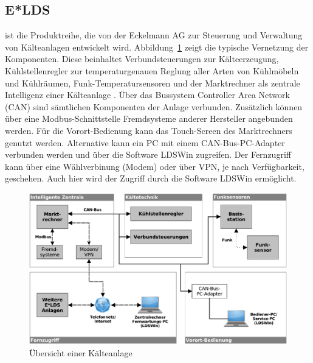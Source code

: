\documentclass[11pt,a4paper]{report}
\begin{document}

\subsection{E*LDS} ist die Produktreihe, die von der Eckelmann AG zur Steuerung und Verwaltung von Kälteanlagen entwickelt wird. Abbildung~\ref{fig:kaelteanlage} zeigt die typische Vernetzung der Komponenten. Diese beinhaltet Verbundsteuerungen zur Kälteerzeugung, Kühlstellenregler zur temperaturgenauen Reglung aller Arten von Kühlmöbeln und Kühlräumen, Funk-Temperatursensoren und der Marktrechner als zentrale Intelligenz einer Kälteanlage \cite{elds}. Über das Bussystem Controller Area Network (CAN) sind sämtlichen Komponenten der Anlage verbunden. Zusätzlich können über eine Modbus-Schnittstelle Fremdsysteme anderer Hersteller angebunden werden. Für die Vorort-Bedienung kann das  Touch-Screen des Marktrechners genutzt werden. Alternative kann ein PC mit einem CAN-Bus-PC-Adapter verbunden werden und über die Software LDSWin zugreifen. Der Fernzugriff kann über eine Wählverbinung (Modem) oder über VPN, je nach Verfügbarkeit, geschehen. Auch hier wird der Zugriff durch die Software LDSWin ermöglicht.

\begin{figure}[htbp]
\centering
\includegraphics[scale=0.65]{images/kaelteanlage_uebersicht.pdf}
\caption{Übersicht einer Kälteanlage}
\label{fig:kaelteanlage}
\end{figure}
\end{document}
